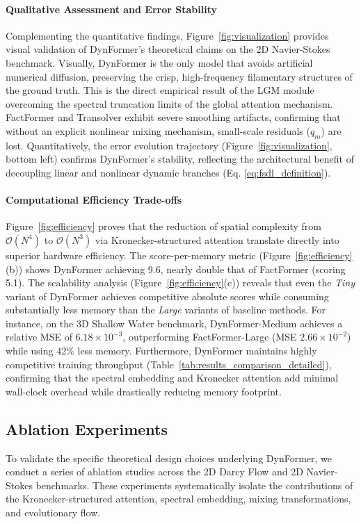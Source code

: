 \documentclass[final,3p,times]{elsarticle}
\begin{document}
\paragraph{Qualitative Assessment and Error Stability}
Complementing the quantitative findings, Figure~\ref{fig:visualization} provides visual validation of DynFormer's theoretical claims on the 2D Navier-Stokes benchmark. Visually, DynFormer is the only model that avoids artificial numerical diffusion, preserving the crisp, high-frequency filamentary structures of the ground truth. This is the direct empirical result of the LGM module overcoming the spectral truncation limits of the global attention mechanism. FactFormer and Transolver exhibit severe smoothing artifacts, confirming that without an explicit nonlinear mixing mechanism, small-scale residuals ($q_m$) are lost. Quantitatively, the error evolution trajectory (Figure~\ref{fig:visualization}, bottom left) confirms DynFormer's stability, reflecting the architectural benefit of decoupling linear and nonlinear dynamic branches (Eq. \eqref{eq:fsdl_definition}).

\paragraph{Computational Efficiency Trade-offs}
Figure~\ref{fig:efficiency} proves that the reduction of spatial complexity from $\mathcal{O}(N^4)$ to $\mathcal{O}(N^3)$ via Kronecker-structured attention translate directly into superior hardware efficiency. The score-per-memory metric (Figure~\ref{fig:efficiency}(b)) shows DynFormer achieving 9.6, nearly double that of FactFormer (scoring 5.1). 
The scalability analysis (Figure~\ref{fig:efficiency}(c)) reveals that even the \textit{Tiny} variant of DynFormer achieves competitive absolute scores while consuming substantially less memory than the \textit{Large} variants of baseline methods. For instance, on the 3D Shallow Water benchmark, DynFormer-Medium achieves a relative MSE of $6.18 \times 10^{-3}$, outperforming FactFormer-Large (MSE $2.66 \times 10^{-2}$) while using 42\% less memory. Furthermore, DynFormer maintains highly competitive training throughput (Table~\ref{tab:results_comparison_detailed}), confirming that the spectral embedding and Kronecker attention add minimal wall-clock overhead while drastically reducing memory footprint.

\subsection{Ablation Experiments}\label{sec:ablation_experiments}
To validate the specific theoretical design choices underlying DynFormer, we conduct a series of ablation studies across the 2D Darcy Flow and 2D Navier-Stokes benchmarks. These experiments systematically isolate the contributions of the Kronecker-structured attention, spectral embedding, mixing transformations, and evolutionary flow. 
\end{document}

